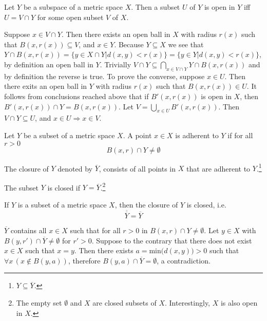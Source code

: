 \documentclass[nobib,notoc]{tufte-handout}
\begin{document}
\begin{thm}
	Let \(Y\) be a subspace of a metric space \(X\). Then a subset \(U\) of \(Y\) is open in \(Y\) iff \(U=V\cap Y\) for some open subset \(V\) of \(X\).
	\begin{IEEEproof}
		Suppose \(x\in V\cap Y\). Then there exists an open ball in \(X\) with radius \(r(x)\) such that \(B(x,r(x))\subseteq V\), and \(x\in Y\). Because \(Y\subseteq X\) we see that \(Y\cap B(x,r(x))=\{y\in X\cap Y|d(x,y)<r(x)\}=\{y\in Y|d(x,y)<r(x)\}\), by definition an open ball in \(Y\). Trivially \(V\cap Y\subseteq\bigcap_{x\in V\cap Y}Y\cap B(x,r(x))\) and by definition the reverse is true.\smallbreak
		To prove the converse, suppose \(x\in U\). Then there exits an open ball in \(Y\) with radius \(r(x)\) such that \(B(x, r(x))\in U\). It follows from conclusions reached above that if \(B'(x, r(x))\) is open in \(X\), then \(B'(x,r(x))\cap Y=B(x,r(x))\). Let \(V=\bigcup_{x\in U}B'(x,r(x))\). Then \(V\cap Y\subseteq U\), and \(x\in U\Rightarrow x\in V\).
\end{IEEEproof}
\end{thm}
\begin{defi}
	Let \(Y\) be a subset of a metric space \(X\). A point \(x\in X\) is adherent to \(Y\) if for all \(r>0\)
	\begin{equation*}
		B(x,r)\cap Y\neq\emptyset
	\end{equation*}
\end{defi}
\begin{defi}[Closure]
	The closure of \(Y\) denoted by \(\overline{Y}\), consists of all points in \(X\) that are adherent to \(Y\).\footnote{\(Y\subseteq\overline{Y}\).}
\end{defi}
\begin{defi}
	The subset \(Y\) is closed if \(Y=\overline{Y}\).\footnote{The empty set \(\emptyset\) and \(X\) are closed subsets of \(X\). Interestingly, \(X\) is also open in \(X\).}
\end{defi}
\begin{thm}
	\label{thm:1:closure}
If \(Y\) is a subset of a metric space \(X\), then the closure of \(Y\) is closed, i.e.
	\begin{equation*}
		\overline{\overline{Y}}=\overline{Y}
	\end{equation*}
\begin{IEEEproof}
	\(\overline{Y}\) contains all \(x\in X\) such that for all \(r>0\) in \(B(x,r)\cap Y\neq\emptyset\). Let \(y\in X\) with \(B(y,r')\cap\overline{Y}\neq\emptyset\) for \(r'>0\). Suppose to the contrary that there does not exist \(x\in X\) such that \(x=y\). Then there exists \(a=\text{min}\big(d(x,y)\big)>0\) such that \(\forall x\,(x\notin B(y,a))\), therefore \(B(y,a)\cap\overline{Y}=\emptyset\), a contradiction.
\end{IEEEproof}
\end{thm}
\end{document}
